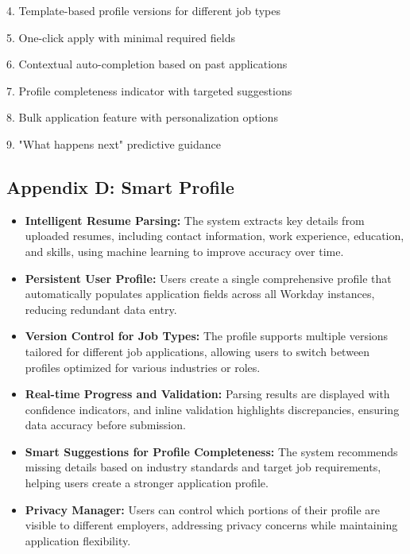 \documentclass[
	letterpaper, %
]{jdf}
\begin{document}
\begin{sloppypar}
4. Template-based profile versions for different job types

5. One-click apply with minimal required fields

6. Contextual auto-completion based on past applications

7. Profile completeness indicator with targeted suggestions

8. Bulk application feature with personalization options

9. "What happens next" predictive guidance

\hfill \break
\subsection{Appendix D: Smart Profile}
 
\begin{itemize}
    \item \textbf{Intelligent Resume Parsing:} The system extracts key details from uploaded resumes, including contact information, work experience, education, and skills, using machine learning to improve accuracy over time.
    
    \item \textbf{Persistent User Profile:} Users create a single comprehensive profile that automatically populates application fields across all Workday instances, reducing redundant data entry.
    
    \item \textbf{Version Control for Job Types:} The profile supports multiple versions tailored for different job applications, allowing users to switch between profiles optimized for various industries or roles.
    
    \item \textbf{Real-time Progress and Validation:} Parsing results are displayed with confidence indicators, and inline validation highlights discrepancies, ensuring data accuracy before submission.
    
    \item \textbf{Smart Suggestions for Profile Completeness:} The system recommends missing details based on industry standards and target job requirements, helping users create a stronger application profile.
    
    \item \textbf{Privacy Manager:} Users can control which portions of their profile are visible to different employers, addressing privacy concerns while maintaining application flexibility.
    

\end{itemize}
\end{sloppypar}
\end{document}
